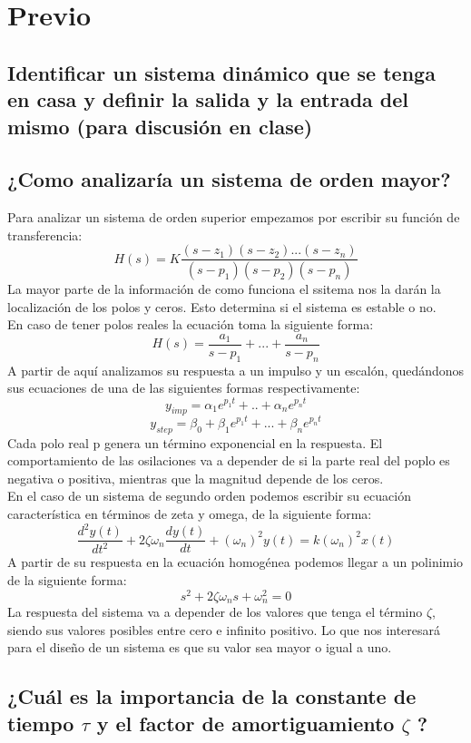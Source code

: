 \noindent \justifying

\section{Previo}

\subsection{Identificar un sistema dinámico que se tenga en casa y definir la salida y la entrada del mismo (para discusión en clase)}
\subsection{¿Como analizaría un sistema de orden mayor?}
Para analizar un sistema de orden superior empezamos por escribir su función de transferencia:
\begin{equation}
H(s)=K\frac{(s-z_1)(s-z_2)...(s-z_n)}{(s-p_1)(s-p_2)(s-p_n)}
\end{equation} 
La mayor parte de la información de como funciona el ssitema nos la darán la localización de los polos y ceros. Esto determina si el sistema es estable o no.\\
En caso de tener polos reales la ecuación toma la siguiente forma:
\begin{equation}
H(s)=\frac{a_1}{s-p_1}+...+\frac{a_n}{s-p_n}
\end{equation}
A partir de aquí analizamos su respuesta a un impulso y un escalón, quedándonos sus ecuaciones de una de las siguientes formas respectivamente:
\begin{equation}
y_{imp}=\alpha_1 e^{p_1t}+..+\alpha_n e^{p_nt}
\end{equation}
\begin{equation}
y_{step}=\beta_0 + \beta_1 e^{p_1t}+...+ \beta_n e^{p_nt}
\end{equation}
Cada polo real p genera un término exponencial en la respuesta. El comportamiento de las osilaciones va a depender de si la parte real del poplo es negativa o positiva, mientras que la magnitud depende de los ceros.\\
En el caso de un sistema de segundo orden podemos escribir su ecuación característica en términos de zeta y omega, de la siguiente forma:
\begin{equation}
\frac{d^2y(t)}{dt^2}+2\zeta \omega_n \frac{dy(t)}{dt}+(\omega_n)^2y(t)=k(\omega_n)^2x(t)
\end{equation}
A partir de su respuesta en la ecuación homogénea podemos llegar a un polinimio de la siguiente forma:
\begin{equation}
s^2+2\zeta\omega_ns+\omega^2_n=0
\end{equation}
La respuesta del sistema va a depender de los valores que tenga el término $\zeta$, siendo sus valores posibles entre cero e infinito positivo. Lo que nos interesará para el diseño de un sistema es que su valor sea mayor o igual a uno.
\subsection{¿Cuál es la importancia de la constante de tiempo $\tau$ y el factor de amortiguamiento $\zeta$ ?}

